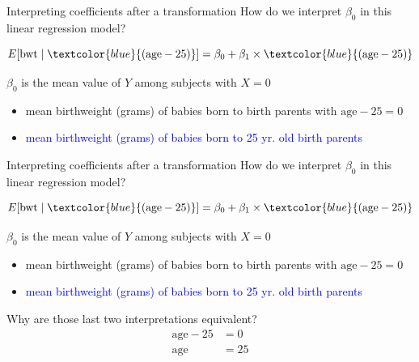 \documentclass[10pt,t]{beamer}
\begin{document}
\begin{frame}{Interpreting coefficients after a transformation}
How do we interpret $\beta_0$ in this linear regression model?

$$
E[\text{bwt} \mid \textcolor{blue}{(\text{age} - 25)}] = \beta_0 + \beta_1 \times \textcolor{blue}{(\text{age} - 25)}
$$

\vspace{0.2cm}

$\beta_0$ is the mean value of $Y$ among subjects with $X = 0$

\begin{itemize}
	\item[] mean birthweight (grams) of babies born to birth parents with $\text{age} - 25 = 0$
	\item[] \textcolor{blue}{mean birthweight (grams) of babies born to 25 yr. old birth parents }
\end{itemize} 


\end{frame}

\begin{frame}{Interpreting coefficients after a transformation}
How do we interpret $\beta_0$ in this linear regression model?

$$
E[\text{bwt} \mid \textcolor{blue}{(\text{age} - 25)}] = \beta_0 + \beta_1 \times \textcolor{blue}{(\text{age} - 25)}
$$

\vspace{0.2cm}

$\beta_0$ is the mean value of $Y$ among subjects with $X = 0$

\begin{itemize}
	\item[] mean birthweight (grams) of babies born to birth parents with $\text{age} - 25 = 0$
	\item[] \textcolor{blue}{mean birthweight (grams) of babies born to 25 yr. old birth parents }
\end{itemize} 

\vspace{0.3cm}

Why are those last two interpretations equivalent?
\begin{align*}
\text{age} - 25 &= 0 \\
\text{age} & = 25
\end{align*}

\end{frame}
\end{document}
